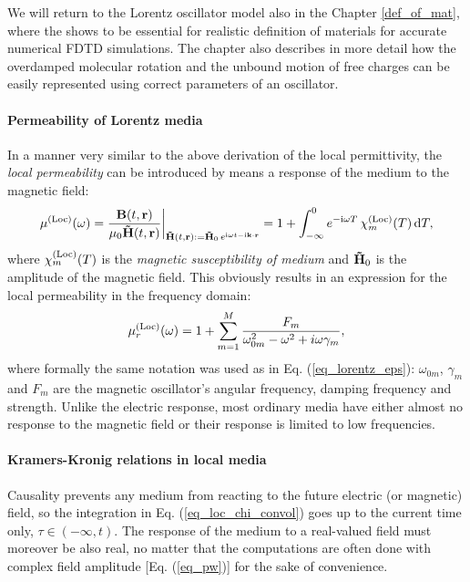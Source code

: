 We will return to the Lorentz oscillator model also in the Chapter \ref{def_of_mat}, where the shows to be essential for realistic definition of materials for accurate numerical FDTD simulations. The chapter also describes in more detail how the overdamped molecular rotation and the unbound motion of free charges can be easily represented using correct parameters of an oscillator.
\paragraph{Permeability of Lorentz media}  %
In a manner very similar to the above derivation of the local permittivity, the \textit{local permeability} can be introduced by means a response of the medium to the magnetic field:
\begin{equation} \mu^{\rm(Loc)}(\omega) = \frac{\mathbf{B}(t,{\mathbf{r}})}{\mu_0\mathbf{\tilde{H}}(t,{\mathbf{r}})} \biggr|_{\mathbf{\tilde{H}}(t, {\mathbf{r}}) := \mathbf{\tilde{H}}_0 \, e^{{\mathrm i}\omega t - {\mathrm i}{\mathbf{k}}\cdot{\mathbf{r}}}} = 1 + \int_{-\infty}^{0} e^{-{\mathrm i}\omega T} \,\chi_m^{\rm(Loc)}(T) \,\mbox{d}T, \label{eq_mu_loc}\end{equation}
where $\chi_m^{\rm(Loc)}(T)$ is the \textit{magnetic susceptibility of medium} and $\mathbf{\tilde{H}}_0$ is the amplitude of the magnetic field. This obviously results in an expression for the local permeability in the frequency domain:
\begin{equation} \mu^{\rm(Loc)}_r(\omega) = 1 + \sum_{m=1}^M \frac{F_m}{\omega_{0m}^2 - \omega^2 + i\omega\gamma_m}, \label{eq_lorentz_mu}\end{equation} %
where formally the same notation was used as in  Eq. (\ref{eq_lorentz_eps}): $\omega_{0m}$, $\gamma_m$ and $F_m$ are the magnetic oscillator's angular frequency, damping frequency and strength. Unlike the electric response, most ordinary media have either almost no response to the magnetic field %
or their response is limited to low frequencies.

\paragraph{Kramers-Kronig relations in local media}%
Causality prevents any medium from reacting to the future electric (or magnetic) field, so the integration in Eq. (\ref{eq_loc_chi_convol}) goes up to the current time only, $\tau \in (-\infty, t)$. The response of the medium to a real-valued field must moreover be also real, no matter that the computations are often done with complex field amplitude [Eq. (\ref{eq_pw})] for the sake of convenience. 

